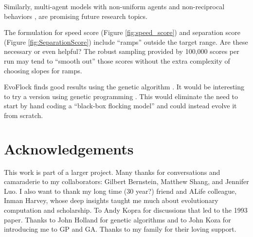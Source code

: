 \documentclass[letterpaper]{article}
\begin{document}
Similarly, multi-agent models with non-uniform agents \citep{montanari_optimal_2025} and non-reciprocal behaviors \citep{choi_flocking_2025}, \citep{weis_generalized_2025} are promising future research topics.

The formulation for speed score (Figure \ref{fig:speed_score}) and separation score (Figure \ref{fig:SeparationScore}) include ``ramps'' outside the target range. Are these necessary or even helpful? The robust sampling provided by 100,000 scores per run may tend to ``smooth out'' those scores without the extra complexity of choosing slopes for ramps.

EvoFlock finds good results using the genetic algorithm \citep{holland_adaptation_1975}. It would be interesting to try a version using genetic programming \citep{koza_genetic_1992}. This would eliminate the need to start by hand coding a ``black-box flocking model'' and could instead evolve it from scratch.

\section{Acknowledgements}
\label{sec:ack}

This work is part of a larger project. Many thanks for conversations and camaraderie to my collaborators: Gilbert Bernstein, Matthew Shang, and Jennifer Luo. I also want to thank my long time (30 year?) friend and ALife colleague, Inman Harvey, whose deep insights taught me much about evolutionary computation and scholarship. To Andy Kopra for discussions that led to the 1993 paper. Thanks to John Holland for genetic algorithms and to John Koza for introducing me to GP and GA. Thanks to my family for their loving support.






\end{document}
